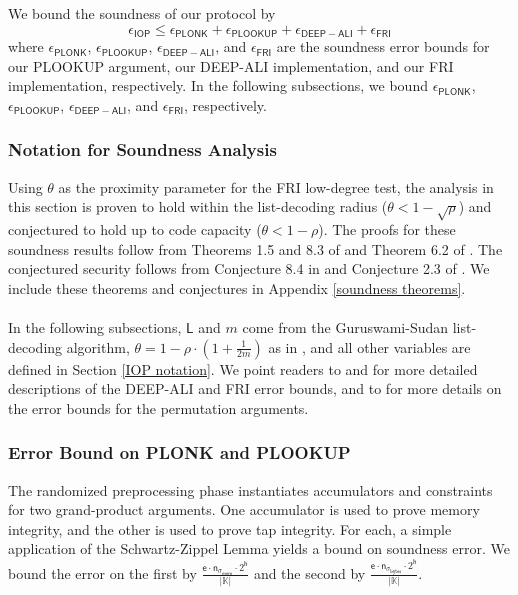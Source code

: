 \documentclass[10pt,letterpaper,titlepage]{article}
\theoremstyle{definition}
\begin{document}
We bound the soundness of our protocol by
\[
  \epsilon_\mathsf{IOP}
    \leq
  \epsilon_\mathsf{PLONK} +
  \epsilon_\mathsf{PLOOKUP} +
  \epsilon_\mathsf{DEEP-ALI} +
  \epsilon_\mathsf{FRI}
\]
where
$\epsilon_\mathsf{PLONK}$, $\epsilon_\mathsf{PLOOKUP}$, $\epsilon_\mathsf{DEEP-ALI}$, and $\epsilon_\mathsf{FRI}$
are the soundness error bounds for our PLOOKUP argument, our DEEP-ALI implementation, and our FRI implementation, respectively.
In the following subsections, we bound $\epsilon_\mathsf{PLONK}$, $\epsilon_\mathsf{PLOOKUP}$, $\epsilon_\mathsf{DEEP-ALI}$, and $\epsilon_\mathsf{FRI}$, respectively.

\subsubsection{Notation for Soundness Analysis}
Using $\theta$ as the proximity parameter for the FRI low-degree test, the analysis in this section is proven to hold within the list-decoding radius ($\theta < 1-\sqrt{\rho}$)
and conjectured to hold up to code capacity ($\theta < 1 - \rho$).
The proofs for these soundness results follow from Theorems 1.5 and 8.3 of \cite{proxGaps} and Theorem 6.2 of \cite{deepFRI}.
The conjectured security follows from Conjecture 8.4 in \cite{proxGaps} and Conjecture 2.3 of \cite{deepFRI}.
We include these theorems and conjectures in Appendix \ref{soundness theorems}.\\
\\
In the following subsections, $\mathsf{L}$ and $m$ come from the Guruswami-Sudan list-decoding algorithm,
$\theta=1-\rho\cdot(1+\frac{1}{2m})$ as in \cite{FRIsummary},
and all other variables are defined in Section \ref{IOP notation}.
We point readers to \cite{FRIsummary} and \cite{ethSTARK} for more detailed descriptions of the DEEP-ALI and FRI error bounds, and to \cite{plonky2} for more details on the error bounds for the permutation arguments.
\subsubsection{Error Bound on PLONK and PLOOKUP}
The randomized preprocessing phase instantiates accumulators and constraints for two grand-product arguments.
One accumulator is used to prove memory integrity, and the other is used to prove tap integrity.
For each, a simple application of the Schwartz-Zippel Lemma yields a bound on soundness error.
We bound the error on the first by
$\frac{\mathsf{e}\cdot\mathsf{n}_{\sigma_\mathsf{mem}}\cdot2^{\mathsf{h}}}{|\mathbb{K}|}$
and the second by
$\frac{\mathsf{e}\cdot\mathsf{n}_{\sigma_\mathsf{bytes}}\cdot2^{\mathsf{h}}}{|\mathbb{K}|}$.
\end{document}
